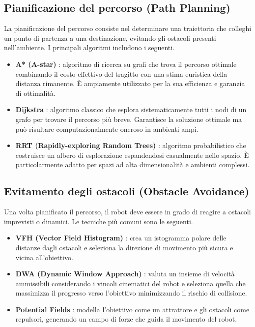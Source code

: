 \subsection{Pianificazione del percorso (Path Planning)}
La pianificazione del percorso consiste nel determinare una traiettoria che colleghi un punto di partenza a una destinazione, evitando gli ostacoli presenti nell'ambiente. I principali algoritmi includono i seguenti.
\begin{itemize}
    \item \textbf{A* (A-star)} \cite{hart1968astar}: algoritmo di ricerca su grafi che trova il percorso ottimale combinando il costo effettivo del tragitto con una stima euristica della distanza rimanente. È ampiamente utilizzato per la sua efficienza e garanzia di ottimalità.
    \item \textbf{Dijkstra} \cite{dijkstra1959note}: algoritmo classico che esplora sistematicamente tutti i nodi di un grafo per trovare il percorso più breve. Garantisce la soluzione ottimale ma può risultare computazionalmente oneroso in ambienti ampi.
    \item \textbf{RRT (Rapidly-exploring Random Trees)} \cite{lavalle1998rrt}: algoritmo probabilistico che costruisce un albero di esplorazione espandendosi casualmente nello spazio. È particolarmente adatto per spazi ad alta dimensionalità e ambienti complessi.
\end{itemize}

\subsection{Evitamento degli ostacoli (Obstacle Avoidance)}
Una volta pianificato il percorso, il robot deve essere in grado di reagire a ostacoli imprevisti o dinamici. Le tecniche più comuni sono le seguenti.
\begin{itemize}
    \item \textbf{VFH (Vector Field Histogram)} \cite{borenstein1991vfh}: crea un istogramma polare delle distanze dagli ostacoli e seleziona la direzione di movimento più sicura e vicina all'obiettivo.
    \item \textbf{DWA (Dynamic Window Approach)} \cite{fox1997dwa}: valuta un insieme di velocità ammissibili considerando i vincoli cinematici del robot e seleziona quella che massimizza il progresso verso l'obiettivo minimizzando il rischio di collisione.
    \item \textbf{Potential Fields} \cite{khatib1986potential}: modella l'obiettivo come un attrattore e gli ostacoli come repulsori, generando un campo di forze che guida il movimento del robot.
\end{itemize}

